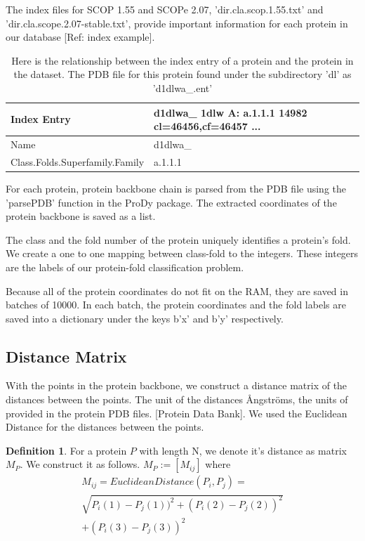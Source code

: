 \documentclass[12pt, a4paper, twocolumn, fullpage]{article}
\theoremstyle{plain}
\theoremstyle{definition}
\newtheorem{defn}{Definition}[section]
\theoremstyle{remark}
\begin{document}
The index files for SCOP 1.55 and SCOPe 2.07, 'dir.cla.scop.1.55.txt' and 'dir.cla.scope.2.07-stable.txt', provide important information for each protein in our database [Ref: index example]. 

\begin{table}[h]
    \centering
    \begin{tabular}{| l | l|}
        \hline 
        Index Entry & d1dlwa\_ 1dlw    A:  a.1.1.1 14982	cl=46456,cf=46457 ... \\ \hline
        Name & d1dlwa\_     \\ \hline
        Class.Folds.Superfamily.Family & a.1.1.1    \\ \hline
    \end{tabular}
    \caption{ Here is the relationship between the index entry of a protein and the protein in the dataset. The PDB file for this protein found under the subdirectory 'dl' as 'd1dlwa\_.ent'}
    \label{tbl:Index Entry}
\end{table}

For each protein, protein backbone chain is parsed from the PDB file using the 'parsePDB' function in the ProDy package. The extracted coordinates of the protein backbone is saved as a list. 

The class and the fold number of the protein uniquely identifies a protein's fold. We create a one to one mapping between class-fold to the integers. These integers are the labels of our protein-fold classification problem.

Because all of the protein coordinates do not fit on the RAM, they are saved in batches of 10000. In each batch, the protein coordinates and the fold labels are saved into a dictionary under the keys b'x' and b'y' respectively.

\subsection{ Distance Matrix}
With the points in the protein backbone, we construct a distance matrix of the distances between the points. The unit of the distances Ångströms, the units of provided in the protein PDB files. [Protein Data Bank]. We used the Euclidean Distance for the distances between the points.\\

    
\begin{defn}
    For a protein $P$ with length N, we denote it's distance as matrix $M_{P}$.
    We construct it as follows.
    $ M_{P} := [M_{ij}] $ where 
    \begin{multline*}
    M_{ij} = Euclidean Distance(P_i, P_j) = \\ \sqrt{P_i(1)-P_j(1))^2+(P_i(2)-P_j(2))^2} \\ +(P_i(3)-P_j(3))^2
    \end{multline*}
\end{defn}
\end{document}
